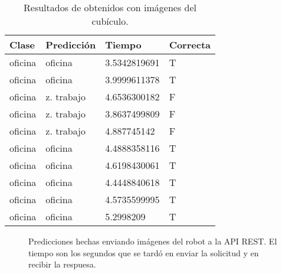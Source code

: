 \begin{table}[!h]
\centering
\begin{tabular}{|l|l|l|l|}
\hline
Clase   & Predicción & Tiempo        & Correcta \\ \hline
oficina & oficina    & 3.5342819691 & T        \\ \hline
oficina & oficina    & 3.9999611378 & T        \\ \hline
oficina & z. trabajo & 4.6536300182 & F        \\ \hline
oficina & z. trabajo & 3.8637499809 & F        \\ \hline
oficina & z. trabajo & 4.887745142  & F        \\ \hline
oficina & oficina    & 4.4888358116 & T        \\ \hline
oficina & oficina    & 4.6198430061 & T        \\ \hline
oficina & oficina    & 4.4448840618 & T        \\ \hline
oficina & oficina    & 4.5735599995 & T        \\ \hline
oficina & oficina    & 5.2998209    & T        \\ \hline
\end{tabular}
\caption{Resultados de obtenidos con imágenes del cubículo.}
\label{table:office}
\end{table}

\begin{figure}[!ht] 
  \centering
{}
\qquad
{}
\qquad
{}
\qquad
{}
\caption{Predicciones hechas enviando imágenes del robot a la API REST. El tiempo son los
segundos que se tardó en enviar la solicitud y en recibir la respuesa. \label{nao_api_images}}
\end{figure}







 

